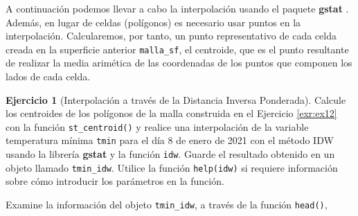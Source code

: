 \documentclass[
]{book}
\theoremstyle{definition}
\theoremstyle{definition}
\theoremstyle{definition}
\newtheorem{exercise}{Ejercicio}[chapter]
\theoremstyle{definition}
\theoremstyle{remark}
\begin{document}
A continuación podemos llevar a cabo la interpolación usando el paquete
\textbf{gstat} \citep{R-gstat}. Además, en lugar de celdas (polígonos) es necesario usar
puntos en la interpolación. Calcularemos, por tanto, un punto representativo de
cada celda creada en la superficie anterior \texttt{malla\_sf}, el centroide, que es el
punto resultante de realizar la media arimética de las coordenadas de los puntos
que componen los lados de cada celda.

\begin{exercise}[Interpolación a través de la Distancia Inversa Ponderada]
\protect\hypertarget{exr:ex13}{}\label{exr:ex13}Calcule los centroides de los polígonos de la malla construida en el Ejercicio
\ref{exr:ex12} con la función \texttt{st\_centroid()} y realice una interpolación de la
variable temperatura mínima \texttt{tmin} para el día 8 de enero de 2021 con el método
IDW usando la librería \textbf{gstat} y la función \texttt{idw}. Guarde el resultado
obtenido en un objeto llamado \texttt{tmin\_idw}. Utilice la función \texttt{help(idw)} si
requiere información sobre cómo introducir los parámetros en la función.

Examine la información del objeto \texttt{tmin\_idw}, a través de la función \texttt{head()},
\end{exercise}
\end{document}
